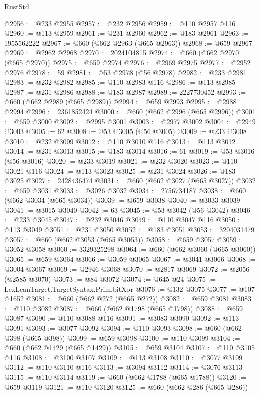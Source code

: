 \begin{lexlean}{RustStd}
\begin{coremodule}
@2956 := @233 @2955
@2957 := @232 @2956
@2959 := @110 @2957 @116
@2960 := @113 @2959
@2961 := @231 @2960
@2962 := @183 @2961
@2963 := 1955562222
@2967 := @660 (@662 @2963 (@665 @2963))
@2968 := @659 @2967
@2969 := @2962 @2968
@2970 := 2024104815
@2974 := @660 (@662 @2970 (@665 @2970))
@2975 := @659 @2974
@2976 := @2969 @2975
@2977 := @2952 @2976
@2978 := 59
@2981 := @53 @2978 (@56 @2978)
@2982 := @233 @2981
@2983 := @232 @2982
@2985 := @110 @2983 @116
@2986 := @113 @2985
@2987 := @231 @2986
@2988 := @183 @2987
@2989 := 2227730452
@2993 := @660 (@662 @2989 (@665 @2989))
@2994 := @659 @2993
@2995 := @2988 @2994
@2996 := 2361852424
@3000 := @660 (@662 @2996 (@665 @2996))
@3001 := @659 @3000
@3002 := @2995 @3001
@3003 := @2977 @3002
@3004 := @2949 @3003
@3005 := 62
@3008 := @53 @3005 (@56 @3005)
@3009 := @233 @3008
@3010 := @232 @3009
@3012 := @110 @3010 @116
@3013 := @113 @3012
@3014 := @231 @3013
@3015 := @183 @3014
@3016 := 61
@3019 := @53 @3016 (@56 @3016)
@3020 := @233 @3019
@3021 := @232 @3020
@3023 := @110 @3021 @116
@3024 := @113 @3023
@3025 := @231 @3024
@3026 := @183 @3025
@3027 := 2428436474
@3031 := @660 (@662 @3027 (@665 @3027))
@3032 := @659 @3031
@3033 := @3026 @3032
@3034 := 2756734187
@3038 := @660 (@662 @3034 (@665 @3034))
@3039 := @659 @3038
@3040 := @3033 @3039
@3041 := @3015 @3040
@3042 := 63
@3045 := @53 @3042 (@56 @3042)
@3046 := @233 @3045
@3047 := @232 @3046
@3049 := @110 @3047 @116
@3050 := @113 @3049
@3051 := @231 @3050
@3052 := @183 @3051
@3053 := 3204031479
@3057 := @660 (@662 @3053 (@665 @3053))
@3058 := @659 @3057
@3059 := @3052 @3058
@3060 := 3329325298
@3064 := @660 (@662 @3060 (@665 @3060))
@3065 := @659 @3064
@3066 := @3059 @3065
@3067 := @3041 @3066
@3068 := @3004 @3067
@3069 := @2946 @3068
@3070 := @2817 @3069
@3072 := @2056 (@2585 @3070)
@3073 := @84 @3072
@3074 := @645 @24
@3075 := LexLeanTarget.TargetSyntax.Prim.bitXor
@3076 := @132 @3075
@3077 := @107 @1652
@3081 := @660 (@662 @272 (@665 @272))
@3082 := @659 @3081
@3083 := @110 @3082
@3087 := @660 (@662 @1798 (@665 @1798))
@3088 := @659 @3087
@3090 := @110 @3088 @116
@3091 := @3083 @3090
@3092 := @113 @3091
@3093 := @3077 @3092
@3094 := @110 @3093
@3098 := @660 (@662 @398 (@665 @398))
@3099 := @659 @3098
@3100 := @110 @3099
@3104 := @660 (@662 @1429 (@665 @1429))
@3105 := @659 @3104
@3107 := @110 @3105 @116
@3108 := @3100 @3107
@3109 := @113 @3108
@3110 := @3077 @3109
@3112 := @110 @3110 @116
@3113 := @3094 @3112
@3114 := @3076 @3113
@3115 := @110 @3114
@3119 := @660 (@662 @1788 (@665 @1788))
@3120 := @659 @3119
@3121 := @110 @3120
@3125 := @660 (@662 @286 (@665 @286))

\end{coremodule}
\end{lexlean}
